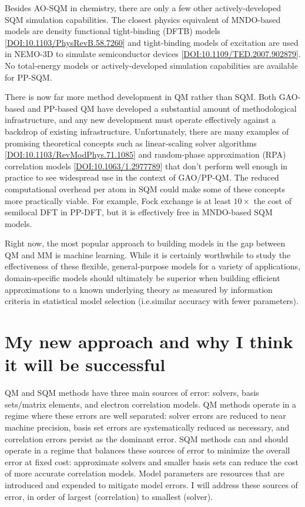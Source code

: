 \documentclass[12pt]{article}
\begin{document}
Besides AO-SQM in chemistry, there are only a few other actively-developed SQM simulation capabilities.
The closest physics equivalent of MNDO-based models are density functional tight-binding (DFTB) models [\href{https://doi.org/10.1103/PhysRevB.58.7260}{DOI:10.1103/PhysRevB.58.7260}]
 and tight-binding models of excitation are used in NEMO-3D to simulate semiconductor devices [\href{https://doi.org/10.1109/TED.2007.902879}{DOI:10.1109/TED.2007.902879}].
No total-energy models or actively-developed simulation capabilities are available for PP-SQM.

There is now far more method development in QM rather than SQM.
Both GAO-based and PP-based QM have developed a substantial amount of methodological infrastructure,
 and any new development must operate effectively against a backdrop of existing infrastructure.
Unfortunately, there are many examples of promising theoretical concepts such as linear-scaling solver algorithms [\href{https://doi.org/10.1103/RevModPhys.71.1085}{DOI:10.1103/RevModPhys.71.1085}]
 and random-phase approximation (RPA) correlation models [\href{https://doi.org/10.1063/1.2977789}{DOI:10.1063/1.2977789}]
 that don't perform well enough in practice to see widespread use in the context of GAO/PP-QM.
The reduced computational overhead per atom in SQM could make some of these concepts more practically viable.
For example, Fock exchange is at least $10\times$ the cost of semilocal DFT in PP-DFT,
 but it is effectively free in MNDO-based SQM models.

Right now, the most popular approach to building models in the gap between QM and MM is machine learning.
While it is certainly worthwhile to study the effectiveness of these flexible, general-purpose models for a variety of applications,
 domain-specific models should ultimately be superior when building efficient approximations to a known underlying theory
 as measured by information criteria in statistical model selection (i.e.\@ similar accuracy with fewer parameters).

\section{My new approach and why I think it will be successful}

QM and SQM methods have three main sources of error: solvers, basis sets/matrix elements, and electron correlation models.
QM methods operate in a regime where these errors are well separated:
 solver errors are reduced to near machine precision, basis set errors are systematically reduced as necessary,
 and correlation errors persist as the dominant error.
SQM methods can and should operate in a regime that balances these sources of error to minimize the overall error at fixed cost:
 approximate solvers and smaller basis sets can reduce the cost of more accurate correlation models.
Model parameters are resources that are introduced and expended to mitigate model errors.
I will address these sources of error, in order of largest (correlation) to smallest (solver).
\end{document}
